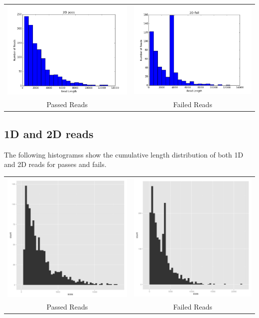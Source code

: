         
        \begin{tabular}{cc}
          \includegraphics[width=.48\textwidth]{2Dpasses}
          &
          \includegraphics[width=.48\textwidth]{2Dfailures}
          \\
          Passed Reads
          &
          Failed Reads
        \end{tabular}

        
\subsection*{1D and 2D reads}

        The following histogramss show the cumulative length distribution of both 1D and 2D reads for passes and fails.

        
        \begin{tabular}{cc}
          \includegraphics[width=.48\textwidth]{histallpass}
          &
          \includegraphics[width=.48\textwidth]{histallfail}
          \\
          Passed Reads
          &
          Failed Reads
        \end{tabular}
